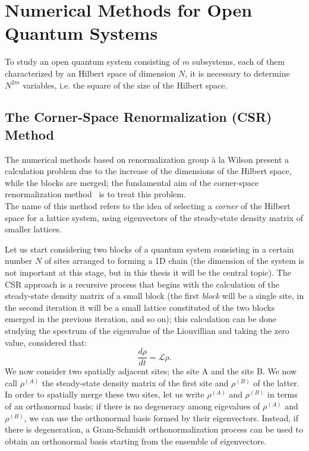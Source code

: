 \chapter{Numerical Methods for Open Quantum Systems}
\label{Chapter2}
To study an open quantum system consisting of $m$ subsystems, each of them characterized by an Hilbert space of dimension $N$, it is necessary to determine $N^{2m}$ variables, i.e. the square of the size of the Hilbert space. 

\section{The Corner-Space Renormalization (CSR) Method}
\label{chapter2_csr}
The numerical methods based on renormalization group à la Wilson present a calculation problem due to the increase of the dimensions of the Hilbert space, while the blocks are merged; the fundamental aim of the corner-space renormalization method~\cite{PhysRevLett.115.080604} is to treat this problem. \\
The name of this method refers to the idea of selecting a \emph{corner} of the Hilbert space for a lattice system, using eigenvectors of the steady-state density matrix of smaller lattices.

Let us start considering two blocks of a quantum system consisting in a certain number $N$ of sites arranged to forming a 1D chain (the dimension of the system is not important at this stage, but in this thesis it will be the central topic). The CSR approach is a recursive process that begins with the calculation of the steady-state density matrix of a small block (the first \emph{block} will be a single site, in the second iteration it will be a small lattice constituted of the two blocks emerged in the previous iteration, and so on); this calculation can be done studying the spectrum of the eigenvalue of the Liouvillian and taking the zero value, considered that:
\begin{equation}
    \frac{d\rho}{dt} = \mathcal{L} \rho.
\end{equation}
We now consider two spatially adjacent sites; the site A and the site B. We now call $\rho^{(A)}$ the steady-state density matrix of the first site and $\rho^{(B)}$ of the latter. In order to spatially merge these two sites, let us write $\rho^{(A)}$ and $\rho^{(B)}$ in terms of an orthonormal basis; if there is no degeneracy among eigevalues of $\rho^{(A)}$ and $\rho^{(B)}$, we can use the orthonormal basis formed by their eigenvectors. Instead, if there is degeneration, a Gram-Schmidt orthonormalization process can be used to obtain an orthonormal basis starting from the ensemble of eigenvectors.

